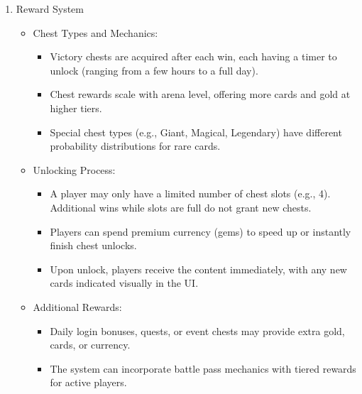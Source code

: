 \documentclass{article}
\begin{document}
\begin{enumerate}[label=\textbf{FR\arabic*:}]
    \item Reward System
    \begin{itemize}
        \item Chest Types and Mechanics:
        \begin{itemize}
            \item Victory chests are acquired after each win, each having a timer to unlock (ranging from a few hours to a full day).
            \item Chest rewards scale with arena level, offering more cards and gold at higher tiers.
            \item Special chest types (e.g., Giant, Magical, Legendary) have different probability distributions for rare cards.
        \end{itemize}
        \item Unlocking Process:
        \begin{itemize}
            \item A player may only have a limited number of chest slots (e.g., 4). Additional wins while slots are full do not grant new chests.
            \item Players can spend premium currency (gems) to speed up or instantly finish chest unlocks.
            \item Upon unlock, players receive the content immediately, with any new cards indicated visually in the UI.
        \end{itemize}
        \item Additional Rewards:
        \begin{itemize}
            \item Daily login bonuses, quests, or event chests may provide extra gold, cards, or currency.
            \item The system can incorporate battle pass mechanics with tiered rewards for active players.
        \end{itemize}
    \end{itemize}
    

\end{enumerate}
\end{document}
